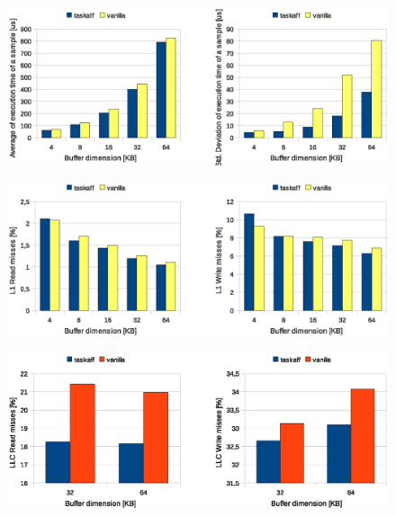 \begin{figure}[htbp]
\centering
\includegraphics[width=\widefigure]{images/results_i7/time_avg_var_i7.eps}
\caption{}
\label{fig:time_avg_var_i7}
\end{figure}

\begin{figure}[htbp]
\centering
\includegraphics[width=\widefigure]{images/results_i7/l1_load_store_i7.eps}
\caption{}
\label{fig:l1_load_store_i7}
\end{figure}

\begin{figure}[htbp]
\centering
\includegraphics[width=\widefigure]{images/results_i7/l3_load_store_i7.eps}
\caption{}
\label{fig:l2_load_store_i7}
\end{figure}

